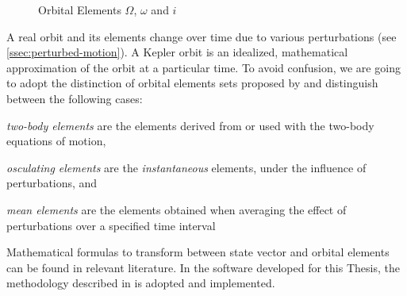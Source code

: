 \begin{figure}
  \centering
  
  \caption{Orbital Elements $\Omega$, $\omega$ and $i$}
  \label{fig:orbital-elements-Ooi}
\end{figure}

A real orbit and its elements change over time due to various perturbations (see 
\autoref{ssec:perturbed-motion}). A Kepler orbit is an idealized, mathematical 
approximation of the orbit at a particular time. To avoid confusion, we are going 
to adopt the distinction of orbital elements sets proposed by \cite{Vallado} and 
distinguish between the following cases:
\begin{description}
  \item \emph{two-body elements} are the elements derived from or used with 
    the two-body equations of motion,
  \item \emph{osculating elements} are the \emph{instantaneous} elements, under 
    the influence of perturbations, and
  \item \emph{mean elements} are the elements obtained when averaging the 
    effect of perturbations over a specified time interval
\end{description}

Mathematical formulas to transform between state vector and orbital elements can 
be found in relevant literature. In the software developed for this Thesis, the 
methodology described in \cite{Montenbruck2000} is adopted and implemented.
